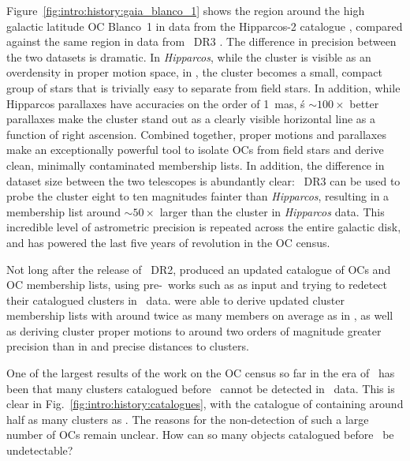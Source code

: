 Figure~\ref{fig:intro:history:gaia_blanco_1} shows the region around the high galactic latitude OC Blanco~1 in data from the Hipparcos-2 catalogue \citep{vanleeuwen_hipparcos_new_2007}, compared against the same region in data from \gaia\ DR3 \citep{gaia_collaboration_gaia_2022}. The difference in precision between the two datasets is dramatic. In \emph{Hipparcos}, while the cluster is visible as an overdensity in proper motion space, in \gaia, the cluster becomes a small, compact group of stars that is trivially easy to separate from field stars. In addition, while Hipparcos parallaxes have accuracies on the order of 1~mas, \gaia\'s $\sim100\times$ better parallaxes make the cluster stand out as a clearly visible horizontal line as a function of right ascension. Combined together, proper motions and parallaxes make an exceptionally powerful tool to isolate OCs from field stars and derive clean, minimally contaminated membership lists. In addition, the difference in dataset size between the two telescopes is abundantly clear: \gaia\ DR3 can be used to probe the cluster eight to ten magnitudes fainter than \emph{Hipparcos}, resulting in a membership list around $\sim50\times$ larger than the cluster in \emph{Hipparcos} data. This incredible level of astrometric precision is repeated across the entire galactic disk, and has powered the last five years of revolution in the OC census.


Not long after the release of \gaia\ DR2, \cite{cantat-gaudin_gaia_2018} produced an updated catalogue of OCs and OC membership lists, using pre-\gaia\ works such as \cite{kharchenko_global_2013} as input and trying to redetect their catalogued clusters in \gaia\ data. \cite{cantat-gaudin_gaia_2018} were able to derive updated cluster membership lists with around twice as many members on average as in \cite{kharchenko_global_2013}, as well as deriving cluster proper motions to around two orders of magnitude greater precision than in \cite{kharchenko_global_2013} and precise distances to clusters.

One of the largest results of the work on the OC census so far in the era of \gaia\ has been that many clusters catalogued before \gaia\ cannot be detected in \gaia\ data. This is clear in Fig.~\ref{fig:intro:history:catalogues}, with the catalogue of \cite{cantat-gaudin_gaia_2018} containing around half as many clusters as \cite{kharchenko_global_2013}. The reasons for the non-detection of such a large number of OCs remain unclear. How can so many objects catalogued before \gaia\ be undetectable?

